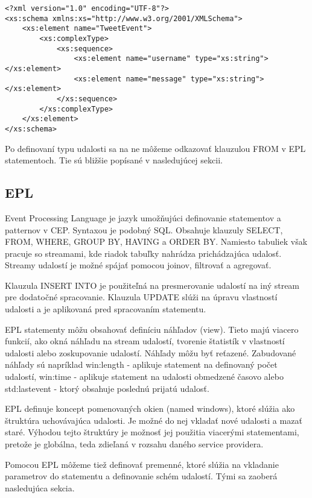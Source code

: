 	\begin{lstlisting}[label=lst:sample-schema,caption=Jednoduchý príklad XML schémy udalosti]
<?xml version="1.0" encoding="UTF-8"?>
<xs:schema xmlns:xs="http://www.w3.org/2001/XMLSchema">
	<xs:element name="TweetEvent">
		<xs:complexType>
			<xs:sequence>
				<xs:element name="username" type="xs:string"></xs:element>
				<xs:element name="message" type="xs:string"></xs:element>
			</xs:sequence>
		</xs:complexType>
	</xs:element>
</xs:schema>		
	\end{lstlisting}

	Po definovaní typu udalosti sa na ne môžeme odkazovať klauzulou FROM v EPL statementoch. Tie sú bližšie popísané v nasledujúcej sekcii.

	\subsection{EPL}
		Event Processing Language je jazyk umožňujúci definovanie statementov a patternov v CEP. Syntaxou je podobný SQL. Obsahuje klauzuly SELECT, FROM, WHERE, GROUP BY, HAVING a ORDER BY. Namiesto tabuliek však pracuje so streamami, kde riadok tabuľky nahrádza prichádzajúca udalosť. Streamy udalostí je možné spájať pomocou joinov, filtrovať a agregovať.
		
		Klauzula INSERT INTO je použiteľná na presmerovanie udalostí na iný stream pre dodatočné spracovanie. Klauzula UPDATE slúži na úpravu vlastností udalosti a je aplikovaná pred spracovaním statementu. 
		
		EPL statementy môžu obsahovať definíciu náhľadov (view). Tieto majú viacero funkcií, ako okná náhľadu na stream udalostí, tvorenie štatistík v vlastností udalosti alebo zoskupovanie udalostí. Náhľady môžu byť reťazené. Zabudované náhľady sú napríklad win:length - aplikuje statement na definovaný počet udalostí, win:time - aplikuje statement na udalosti obmedzené časovo alebo std:lastevent - ktorý obsahuje poslednú prijatú udalosť.
		
		EPL definuje koncept pomenovaných okien (named windows), ktoré slúžia ako štruktúra uchovávajúca udalosti. Je možné do nej vkladať nové udalosti a mazať staré. Výhodou tejto štruktúry je možnosť jej použitia viacerými statementami, pretože je globálna, teda zdieľaná v rozsahu daného service providera.	
		
		Pomocou EPL môžeme tiež definovať premenné, ktoré slúžia na vkladanie parametrov do statementu a definovanie schém udalostí. Tými sa zaoberá nasledujúca sekcia.
		
